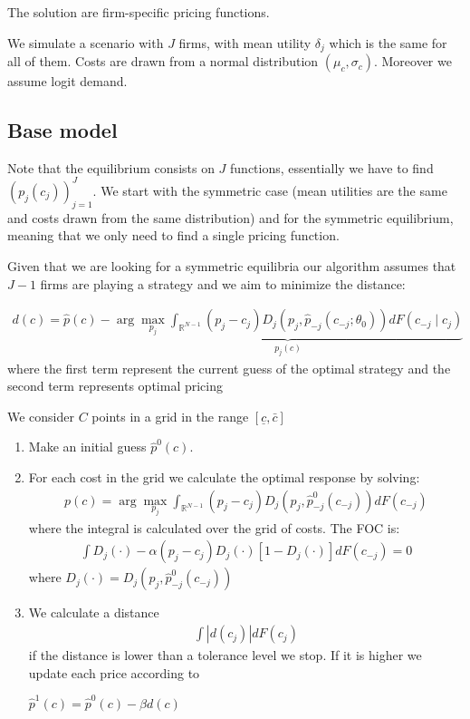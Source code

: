 \documentclass[12pt]{article}
\begin{document}
The solution are firm-specific pricing functions. 

\medskip

We simulate a scenario with $J$ firms, with mean utility $\delta_j$ which is the same for all of them. Costs are drawn from a normal distribution $(\mu_c, \sigma_c)$. %
Moreover we assume logit demand. 
\subsection{Base model}
Note that the equilibrium consists on $J$ functions, essentially we have to find $(p_j(c_j))_{j=1}^J$. We start with the symmetric case (mean utilities are the same and costs drawn from the same distribution) and for the symmetric equilibrium, meaning that we only need to find a single pricing function. 

Given that we are looking for a symmetric equilibria our algorithm assumes that $J-1$ firms are playing a strategy  and we aim to minimize the distance: 


\begin{align} %
    d(c) = \hat{p}(c) -\underbrace{\arg \max_{p_j} \int_{\mathbb{R}^{N-1}}^{} (p_j - c_j) D_j(p_j, \hat{p}_{-j}(c_{-j}; \theta_0)) dF(c_{-j} \mid c_j)}_{p_j(c)}
\end{align} 
where the first term represent the current guess of the optimal strategy and the  second term represents optimal pricing 


We consider $C$ points in a grid in the range $[\underline{c}, \bar{c}] $

\begin{enumerate}
    \item Make an initial guess $\hat{p}^0(c)$. 
    \item For each cost in the grid we calculate the optimal response by solving: 
    \begin{align} %
        p(c) = \arg \max_{p_j} \int_{\mathbb{R}^{N-1}}^{} (p_j - c_j) D_j(p_j, \hat{p}^0_{-j}(c_{-j})) dF(c_{-j})
    \end{align}  
    where the integral is calculated over the grid of costs.
    The FOC is:  
    \begin{align} %
        \int D_j(\cdot) -\alpha  (p_j - c_j)  D_j(\cdot) [1-D_j(\cdot)] dF(c_{-j}) = 0 
    \end{align} 
    where $D_j(\cdot) = D_j(p_j, \hat{p}^0_{-j}(c_{-j}))$
    

    
    \item We calculate a distance 
    \begin{align} %
        \int | d(c_j) | dF(c_j)
    \end{align}
    if the distance is lower than a tolerance level we stop. If it is higher we update each price according to 

    $\hat{p}^1(c) = \hat{p}^0(c) - \beta d(c)$
    
\end{enumerate}
\end{document}
